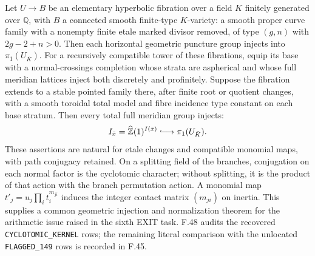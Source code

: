 Let $U\to B$ be an elementary hyperbolic fibration over a field $K$
finitely generated over $\mathbb Q$, with $B$ a connected smooth
finite-type $K$-variety: a smooth proper curve family with
a nonempty finite etale marked divisor removed, of type $(g,n)$ with
$2g-2+n>0$. Then each horizontal geometric puncture group injects into
$\pi_1(U_{\bar K})$. For a recursively compatible tower of these
fibrations, equip its base with a normal-crossings completion whose
strata are aspherical and whose full meridian lattices inject both
discretely and profinitely. Suppose the fibration extends to a stable
pointed family there, after finite root or quotient changes, with a
smooth toroidal total model and fibre incidence type constant on each
base stratum. Then every total full meridian group injects:
\[
 I_{\bar x}=\widehat{\mathbb Z}(1)^{I(\bar x)}
       \lhook\joinrel\longrightarrow\pi_1(U_{\bar K}).
\]
These assertions are natural for etale changes and compatible monomial
maps, with path conjugacy retained. On a splitting field of the
branches, conjugation on each normal factor is the cyclotomic character;
without splitting, it is the product of that action with the branch
permutation action. A monomial map $t'_j=u_j\prod_i t_i^{m_{ji}}$ induces
the integer contact matrix $(m_{ji})$ on inertia. This supplies a common
geometric injection and normalization theorem for the arithmetic issue
raised in the sixth EXIT task. F.48 audits the recovered
\texttt{CYCLOTOMIC\_KERNEL} rows; the remaining literal comparison
with the unlocated \texttt{FLAGGED\_149} rows is recorded in F.45.

